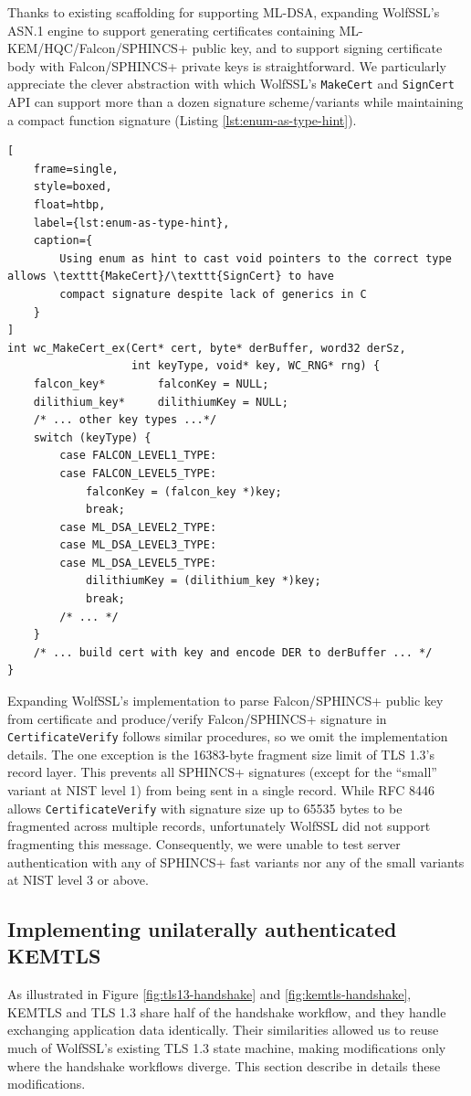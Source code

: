 \documentclass[letterpaper,12pt,titlepage,oneside,final]{book}
\begin{document}
Thanks to existing scaffolding for supporting ML-DSA, expanding WolfSSL's ASN.1 engine to support generating certificates containing ML-KEM/HQC/Falcon/SPHINCS+ public key, and to support signing certificate body with Falcon/SPHINCS+ private keys is straightforward.
We particularly appreciate the clever abstraction with which WolfSSL's \texttt{MakeCert} and \texttt{SignCert} API can support more than a dozen signature scheme/variants while maintaining a compact function signature (Listing \ref{lst:enum-as-type-hint}).

\begin{lstlisting}[
    frame=single, 
    style=boxed, 
    float=htbp,
    label={lst:enum-as-type-hint}, 
    caption={
        Using enum as hint to cast void pointers to the correct type allows \texttt{MakeCert}/\texttt{SignCert} to have
        compact signature despite lack of generics in C
    }
]
int wc_MakeCert_ex(Cert* cert, byte* derBuffer, word32 derSz, 
                   int keyType, void* key, WC_RNG* rng) {
    falcon_key*        falconKey = NULL;
    dilithium_key*     dilithiumKey = NULL;
    /* ... other key types ...*/
    switch (keyType) {
        case FALCON_LEVEL1_TYPE:
        case FALCON_LEVEL5_TYPE:
            falconKey = (falcon_key *)key;
            break;
        case ML_DSA_LEVEL2_TYPE:
        case ML_DSA_LEVEL3_TYPE:
        case ML_DSA_LEVEL5_TYPE:
            dilithiumKey = (dilithium_key *)key;
            break;
        /* ... */
    }
    /* ... build cert with key and encode DER to derBuffer ... */
}
\end{lstlisting}

Expanding WolfSSL's implementation to parse Falcon/SPHINCS+ public key from certificate and produce/verify Falcon/SPHINCS+ signature in \texttt{CertificateVerify} follows similar procedures, so we omit the implementation details.
The one exception is the 16383-byte fragment size limit of TLS 1.3's record layer.
This prevents all SPHINCS+ signatures (except for the ``small'' variant at NIST level 1) from being sent in a single record.
While RFC 8446 allows \texttt{CertificateVerify} with signature size up to 65535 bytes to be fragmented across multiple records, unfortunately WolfSSL did not support fragmenting this message.
Consequently, we were unable to test server authentication with any of SPHINCS+ fast variants nor any of the small variants at NIST level 3 or above.

\subsection{Implementing unilaterally authenticated KEMTLS}\label{sec:implementing-kemtls}
As illustrated in Figure \ref{fig:tls13-handshake} and \ref{fig:kemtls-handshake}, KEMTLS and TLS 1.3 share half of the handshake workflow, and they handle exchanging application data identically.
Their similarities allowed us to reuse much of WolfSSL's existing TLS 1.3 state machine, making modifications only where the handshake workflows diverge. This section describe in details these modifications.
\end{document}
